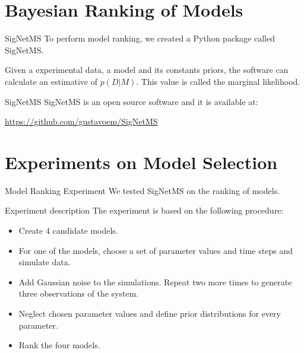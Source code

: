 \documentclass{beamer}
\begin{document}
\section{Bayesian Ranking of Models}

%
\begin{frame}{SigNetMS}
To perform model ranking, we created a Python package called SigNetMS.
\pause

Given a experimental data, a model and its constants priors, the 
software can calculate an estimative of $p (D | M)$. This value is 
called the marginal likelihood.
\end{frame}


\begin{frame}{SigNetMS}
SigNetMS is an open source software and it is available at:
\begin{center}
    \href{https://github.com/gustavoem/SigNetMS}{https://github.com/gustavoem/SigNetMS}
\end{center}
\end{frame}

\section{Experiments on Model Selection}
\begin{frame}{Model Ranking Experiment}
We tested SigNetMS on the ranking of models.
\end{frame}


\begin{frame}{Experiment description}
The experiment is based on the following procedure:
\begin{itemize}
    \pause
    \item{Create 4 candidate models.}
    \pause
    \item{For one of the models, choose a set of parameter values 
        and time steps and simulate data.}
    \pause
    \item{Add Gaussian noise to the simulations. Repeat two more 
        times to generate three observations of the system.}
    \pause
    \item{Neglect chosen parameter values and define prior distributions
        for every parameter.}
    \pause
    \item{Rank the four models.}
\end{itemize}
\end{frame}
\end{document}
